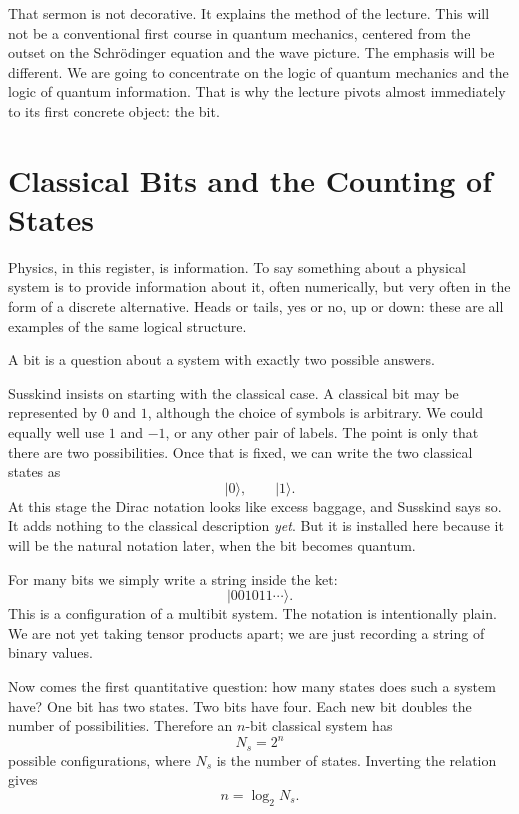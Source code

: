 That sermon is not decorative. It explains the method of the lecture. This will not be a conventional first course in quantum mechanics, centered from the outset on the Schr\"odinger equation and the wave picture. The emphasis will be different. We are going to concentrate on the logic of quantum mechanics and the logic of quantum information. That is why the lecture pivots almost immediately to its first concrete object: the bit.

\section{Classical Bits and the Counting of States}

Physics, in this register, is information. To say something about a physical system is to provide information about it, often numerically, but very often in the form of a discrete alternative. Heads or tails, yes or no, up or down: these are all examples of the same logical structure.

\begin{definition}
A bit is a question about a system with exactly two possible answers.
\end{definition}

Susskind insists on starting with the classical case. A classical bit may be represented by \(0\) and \(1\), although the choice of symbols is arbitrary. We could equally well use \(1\) and \(-1\), or any other pair of labels. The point is only that there are two possibilities. Once that is fixed, we can write the two classical states as
\begin{equation}
|0\rangle,\qquad |1\rangle.
\end{equation}
At this stage the Dirac notation looks like excess baggage, and Susskind says so. It adds nothing to the classical description \emph{yet}. But it is installed here because it will be the natural notation later, when the bit becomes quantum.

For many bits we simply write a string inside the ket:
\begin{equation}
|001011\cdots\rangle.
\end{equation}
This is a configuration of a multibit system. The notation is intentionally plain. We are not yet taking tensor products apart; we are just recording a string of binary values.

Now comes the first quantitative question: how many states does such a system have? One bit has two states. Two bits have four. Each new bit doubles the number of possibilities. Therefore an \(n\)-bit classical system has
\begin{equation}
N_s=2^n
\end{equation}
possible configurations, where \(N_s\) is the number of states. Inverting the relation gives
\begin{equation}
n=\log_2 N_s.
\end{equation}

